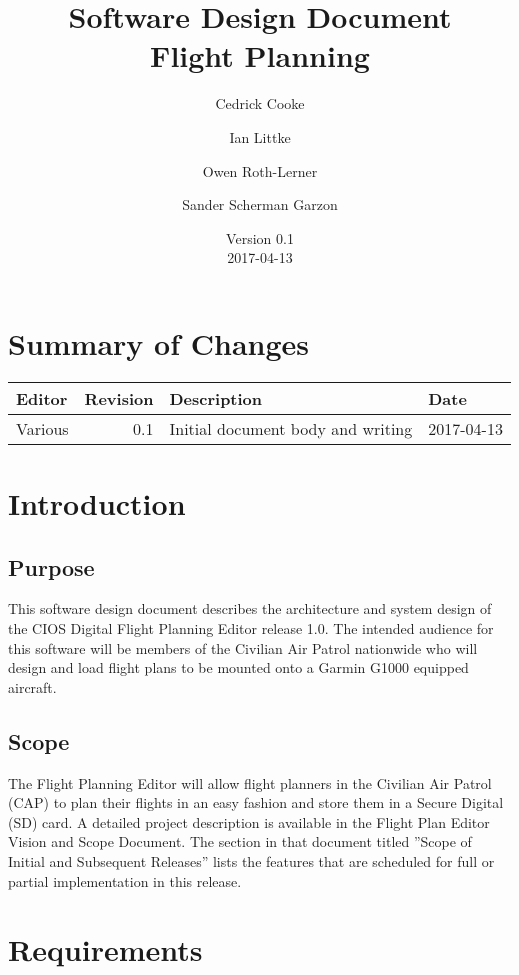 \documentclass[12pt, letterpaper]{article}
\title{Software Design Document \\
Flight Planning
}
\author{ Cedrick Cooke
    \and Ian Littke
    \and Owen Roth-Lerner
    \and Sander Scherman Garzon
}
\date{Version 0.1 \\ 2017-04-13}
\begin{document}
\maketitle

\tableofcontents

\section*{Summary of Changes}
\begin{tabularx}{\textwidth}{|l|r|X|l|}
\hline
Editor & Revision & Description & Date \\ \hline \hline
Various & 0.1 & Initial document body and writing & 2017-04-13 \\ \hline
\end{tabularx}

\section{Introduction}
\subsection{Purpose}
This software design document describes the architecture and system design of the CIOS Digital Flight Planning Editor release 1.0. 
The intended audience for this software will be members of the Civilian Air Patrol nationwide who will design and load flight plans to be mounted onto a Garmin G1000 equipped aircraft.

\subsection{Scope}
The Flight Planning Editor will allow flight planners in the Civilian Air Patrol (CAP) to plan their flights in an easy fashion and store them in a Secure Digital (SD) card. A detailed project description is available in the Flight Plan Editor Vision and Scope Document. The section in that document titled ”Scope of Initial and Subsequent Releases” lists the features that are scheduled for full or partial implementation in this release.


\section{Requirements}
\end{document}
